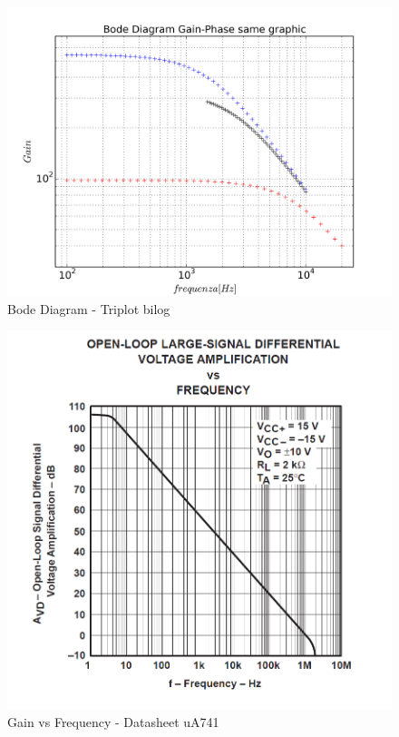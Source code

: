\documentclass{beamer}
\begin{document}
\begin{frame}
\begin{figure}
\centering
\includegraphics[width=0.9\linewidth]{./es_9_bode_triplot_same}
\caption{Bode Diagram - Triplot bilog}
\label{fig:es_9_bode_triplot_same}
\end{figure}

\end{frame}

\begin{frame}
\begin{figure}
\centering
\includegraphics[width=0.7\linewidth]{./ua741}
\caption{Gain vs Frequency - Datasheet uA741}
\label{fig:ua741}
\end{figure}

\end{frame}
\end{document}
